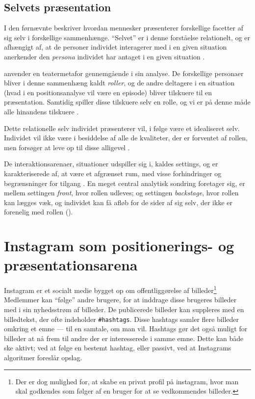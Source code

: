 \subsection{Selvets præsentation}

I den førnævnte  
beskriver \citeauthor{goffmanPresentationSelfEveryday1956} hvordan 
mennesker præsenterer forskellige facetter af sig selv i 
forskellige sammenhænge. “Selvet” er i denne forståelse 
relationelt, og er afhængigt af, at de personer individet 
interagerer med i en given situation anerkender den \emph{persona} 
individet har antaget i en given situation \autocite[s.  
???]{goffmanPresentationSelfEveryday1956}.

\citeauthor{goffmanPresentationSelfEveryday1956} anvender en 
teatermetafor gennemgående i sin analyse. De forskellige personaer 
bliver i denne sammenhæng kaldt \emph{roller}, og de andre 
deltagere i en situation (hvad i en positionsanalyse vil være en 
episode) bliver tilskuere til en præsentation. Samtidig spiller 
disse tilskuere selv en rolle, og vi er på denne måde alle 
hinandens tilskuere \autocite[s. 
???]{goffmanPresentationSelfEveryday1956}.

Dette relationelle selv individet præsenterer vil, i følge 
\citeauthor{goffmanPresentationSelfEveryday1956} være et 
idealiseret selv. Individet vil ikke være i besiddelse af alle de 
kvaliteter, der er forventet af rollen, men forsøger at leve op 
til disse alligevel \citeyear[s.  
???]{goffmanPresentationSelfEveryday1956}.

De interaktionsarenaer, situationer udspiller sig i, kaldes 
settings, og er karakteriserede af, at være et afgrænset rum, med 
visse forhindringer og begrænsninger for tilgang \autocite[s.  
???]{goffmanPresentationSelfEveryday1956}. En meget central 
analytisk sondring 
\citeauthor{goffmanPresentationSelfEveryday1956} foretager sig, er
mellem settingen \emph{front}, hvor rollen udleves; og settingen 
\emph{backstage}, hvor rollen kan lægges væk, og individet kan få 
afløb for de sider af sig selv, der ikke er forenelig med rollen 
(\citeyear[s. ???]{goffmanPresentationSelfEveryday1956}).

\section{Instagram som positionerings- og præsentationsarena}
Instagram er et socialt medie bygget op om offentliggørelse af 
billeder\footnote{Der er dog mulighed for, at skabe en privat 
profil på instagram, hvor man skal godkendes som følger af en 
bruger for at se vedkommendes billeder.} Medlemmer kan “følge” 
andre brugere, for at inddrage disse brugeres billeder med i sin 
nyhedsstrøm af billeder. De publicerede billeder kan suppleres med 
en billedtekst, der ofte indeholder \texttt{\#hashtags}. Disse 
hashtags samler flere billeder omkring et emne — til en samtale, 
om man vil. Hashtags gør det også muligt for billeder at nå frem 
til andre der er interesserede i samme emne. Dette kan både ske 
aktivt; ved at følge en bestemt hashtag, eller passivt, ved at 
Instagrams algoritmer foreslår opslag.

